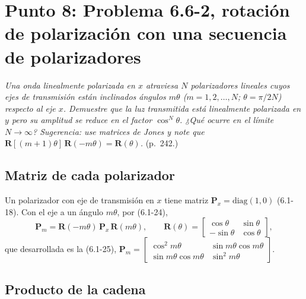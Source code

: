 \documentclass{article}
\newcommand{\Rm}{\mathbf{R}}
\newcommand{\Pm}{\mathbf{P}}
\begin{document}
\section{Punto 8: Problema 6.6-2, rotación de polarización con una secuencia de polarizadores}

\emph{Una onda linealmente polarizada en $x$ atraviesa $N$ polarizadores lineales cuyos ejes de
transmisión están inclinados ángulos $m\theta$ ($m=1,2,\dots,N$; $\theta=\pi/2N$) respecto al
eje $x$. Demuestre que la luz transmitida está linealmente polarizada en $y$ pero su amplitud se
reduce en el factor $\cos^N\theta$. ¿Qué ocurre en el límite $N\to\infty$? Sugerencia: use
matrices de Jones y note que $\Rm[(m+1)\theta]\,\Rm(-m\theta)=\Rm(\theta)$.} (p.~242.)

\subsection*{Matriz de cada polarizador}

Un polarizador con eje de transmisión en $x$ tiene matriz $\Pm_x=\mathrm{diag}(1,0)$ (6.1-18).
Con el eje a un ángulo $m\theta$, por (6.1-24),
\[
\Pm_m=\Rm(-m\theta)\,\Pm_x\,\Rm(m\theta),
\qquad
\Rm(\theta)=\begin{bmatrix}\cos\theta&\sin\theta\\-\sin\theta&\cos\theta\end{bmatrix},
\]
que desarrollada es la (6.1-25),
$\Pm_m=\begin{bmatrix}\cos^2m\theta&\sin m\theta\cos m\theta\\ \sin m\theta\cos m\theta&\sin^2m\theta\end{bmatrix}$.

\subsection*{Producto de la cadena}
\end{document}

